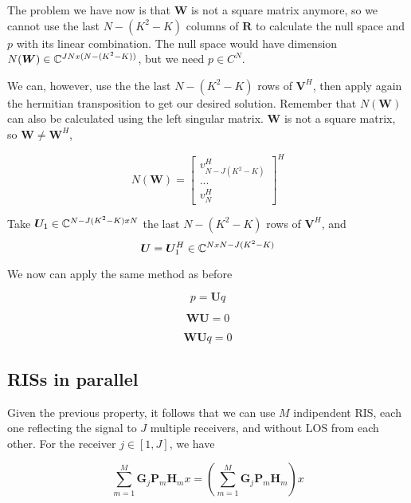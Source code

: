 The problem we have now is that $\bm{W}$ is not a square matrix anymore, so we cannot use the last $N - (K^2 - K)$ columns of $\bm{R}$ to calculate the null space and $p$ with its linear combination. The null space would have dimension $N(\bm{W}) \in \mathbb{C}^{JN x (N - (K^2 - K))}$, but we need $p \in C^N$.

We can, however, use the the last $N - (K^2 - K)$ rows of $\bm{V}^H$, then apply again the hermitian transposition to get our desired solution. Remember that $N(\bm{W})$ can also be calculated using the left singular matrix. $\bm{W}$ is not a square matrix, so $\bm{W} \ne \bm{W}^H$,

\begin{equation}
  N(\bm{W}) = \begin{bmatrix} v^H_{N - J(K^2 - K)} \\ ... \\ v^H_N \end{bmatrix} ^ H
\end{equation}

Take $\bm{U}_1 \in \mathbb{C} ^ {N - J(K^2 - K) x N}$ the last $N - (K^2 - K)$ rows of $\bm{V}^H$, and
\begin{equation}
  \bm{U} = \bm{U}_1^H \in \mathbb{C} ^ {N x N - J(K^2 - K)}
\end{equation}

We now can apply the same method as before

\begin{equation}p = \bm{U}q\end{equation}

\begin{equation}\bm{WU} = 0\end{equation}

\begin{equation}\bm{WU}q = 0\end{equation}

\subsection{RISs in parallel}

Given the previous property, it follows that we can use $M$ indipendent RIS, each one reflecting the signal to $J$ multiple receivers, and without LOS from each other. For the receiver $j \in [1, J]$, we have

\begin{equation}
  \sum_{m=1}^M \bm{G}_j \bm{P}_m \bm{H}_m x = (\sum_{m=1}^M \bm{G}_j \bm{P}_m \bm{H}_m) x
\end{equation}

